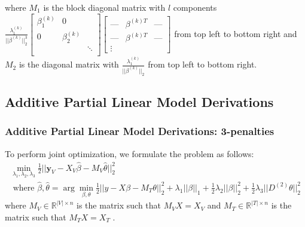\documentclass[10pt,letterpaper]{article}
\begin{document}
where $M_1$ is the block diagonal matrix with $l$ components 
$
\frac{\lambda_1^{(k)}}{|| \beta^{(k)}||_2^3}
\begin{bmatrix} 
\beta_1^{(k)} & 0 & \\
0 & \beta_2^{(k)} &  \\
 &  & \ddots \\
\end{bmatrix}
\begin{bmatrix}
\text{---} & \beta^{(k)T} & \text{---} \\
\text{---} & \beta^{(k)T} & \text{---} \\
\vdots
\end{bmatrix}
$ from top left to bottom right and $M_2$ is the diagonal matrix with $\frac{\lambda_1^{(k)}}{|| \beta^{(k)}||_2}$ from top left to bottom right.


\subsection{Additive Partial Linear Model Derivations}

\subsubsection{Additive Partial Linear Model Derivations: 3-penalties}

To perform joint optimization, we formulate the problem as follows:
\begin{multline}
\min_{\lambda_1, \lambda_2, \lambda_3} \frac{1}{2} \bigl\lvert\bigl\lvert \boldsymbol y_V - X_V\hat\beta - M_V \hat\theta \bigl\rvert\bigl\rvert^2_2 \\
\text{ where } \hat\beta, \hat\theta = \arg\min_{\beta, \theta} \frac{1}{2} \bigl\lvert\bigl\lvert y - X\beta - M_T \theta \bigl\rvert\bigl\rvert^2_2
+ \lambda_1 \lvert\lvert \beta \rvert \rvert_1
+ \frac{1}{2} \lambda_2 \lvert\lvert \beta \rvert \rvert_2^2
+ \frac{1}{2} \lambda_3 \lvert\lvert D^{(2)} \theta \rvert \rvert_2^2
\end{multline}
where $M_V \in \mathbb{R}^{|V| \times n}$ is the matrix such that $M_V X = X_V$ and $M_T \in \mathbb{R}^{|T| \times n}$ is the matrix such that $M_T X = X_T$ .
\end{document}
